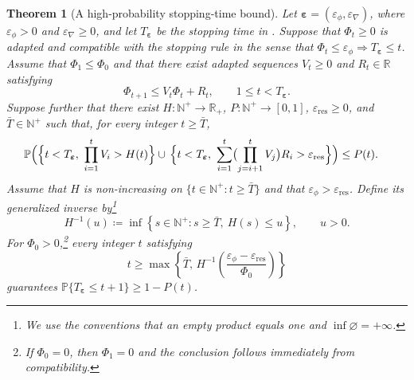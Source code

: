 \documentclass[10pt,a4paper]{amsart}
\theoremstyle{plain}
\newtheorem{theorem}{Theorem}
\theoremstyle{definition}
\theoremstyle{remark}
\begin{document}
\begin{theorem}[A high-probability stopping-time bound]
\label{Big_threorem}
Let
\(\boldsymbol\varepsilon=(\varepsilon_\phi,\varepsilon_\nabla)\), where
\(\varepsilon_\phi>0\) and \(\varepsilon_\nabla\ge0\), and let
\(T_{\boldsymbol\varepsilon}\) be the stopping time in
.  Suppose that \(\Phi_t\ge0\) is adapted and
compatible with the stopping rule in the sense that
$\Phi_t\le\varepsilon_\phi
\Longrightarrow
T_{\boldsymbol\varepsilon}\le t$.
Assume that \(\Phi_1\le\Phi_0\) and that there exist adapted sequences
\(V_t\ge0\) and \(R_t\in\mathbb R\) satisfying
\begin{equation}\label{eq:abstract_one_step}
\Phi_{t+1}\le V_t\Phi_t+R_t,
\qquad 1\le t<T_{\boldsymbol\varepsilon}.
\end{equation}
Suppose further that there exist
\(H\colon \mathbb N^+\to\mathbb R_+\),
\(P\colon \mathbb N^+\to[0,1]\),
\(\varepsilon_{\mathrm{res}}\ge0\), and
\(\bar T\in\mathbb N^+\) such that, for every integer
\(t\ge\bar T\),
\begin{equation}\label{eq:abstract_tail_event}
\begin{aligned}
\mathbb P\Bigl(&
\Bigl\{
 t<T_{\boldsymbol\varepsilon},\
 \prod_{i=1}^tV_i>H(t)
\Bigr\}\cup\,
\Bigl\{
 t<T_{\boldsymbol\varepsilon},\
 \sum_{i=1}^t
 \bigl(\prod_{j=i+1}^tV_j\bigr)R_i
 >\varepsilon_{\mathrm{res}}
\Bigr\}
\Bigr)
\le P(t).
\end{aligned}
\end{equation}
Assume that \(H\) is non-increasing on
\(\{t\in\mathbb N^+:t\ge\bar T\}\) and that
\(\varepsilon_\phi>\varepsilon_{\mathrm{res}}\). Define its generalized
inverse by\footnote{We use the conventions that an empty product equals
one and \(\inf\varnothing=+\infty\).}
\begin{equation}\label{eq:abstract_inverse_H}
H^{-1}(u)
\coloneqq 
\inf\left\{
s\in\mathbb N^+:
s\ge\bar T,\ H(s)\le u
\right\},
\qquad u>0.
\end{equation}
For \(\Phi_0>0\),\footnote{If
\(\Phi_0=0\), then \(\Phi_1=0\) and the conclusion follows immediately
from compatibility.} every integer \(t\) satisfying
\begin{equation}\label{eq:abstract_complexity_inverse}
t\ge\max\left\{
\bar T,\,
H^{-1}\!\left(
\frac{\varepsilon_\phi-\varepsilon_{\mathrm{res}}}{\Phi_0}
\right)
\right\}
\end{equation}
guarantees
\(\mathbb P\{T_{\boldsymbol\varepsilon}\leq t+1\}\geq1-P(t)\).

\end{theorem}
\end{document}
